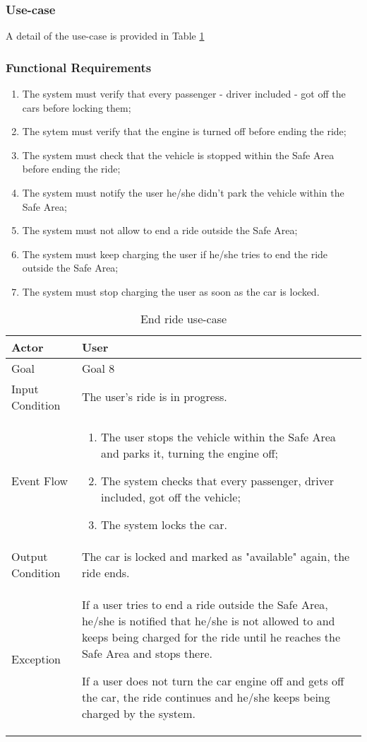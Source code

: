 \subsubsection{Use-case}
A detail of the use-case is provided in Table \ref{end_ride_uc}

\subsubsection{Functional Requirements}
\begin{enumerate}
\item The system must verify that every passenger - driver included - got off the cars before locking them;
\item The sytem must verify that the engine is turned off before ending the ride;
\item The system must check that the vehicle is stopped within the Safe Area before ending the ride;
\item The system must notify the user he/she didn't park the vehicle within the Safe Area;
\item The system must not allow to end a ride outside the Safe Area;
\item The system must keep charging the user if he/she tries to end the ride outside the Safe Area;
\item The system must stop charging the user as soon as the car is locked.
\end{enumerate}

\begin{table}[H]
\begin{center}
\begin{tabular}{p{} | p{}}
\hline
Actor & User\\
\hline
Goal & Goal 8\\
\hline
Input Condition & The user's ride is in progress.\\
\hline
Event Flow & 
\begin{enumerate}
\item The user stops the vehicle within the Safe Area and parks it, turning the engine off;
\item The system checks that every passenger, driver included, got off the vehicle;
\item The system locks the car.
\end{enumerate} \\
\hline
Output Condition & The car is locked and marked as "available" again, the ride ends.\\
\hline
Exception & If a user tries to end a ride outside the Safe Area, he/she is notified that he/she is not allowed to and keeps being charged for the ride until he reaches the Safe Area and stops there.

If a user does not turn the car engine off and gets off the car, the ride continues and he/she keeps being charged by the system.\\
\hline
\end{tabular}
\end{center}
\caption{End ride use-case}
\label{end_ride_uc}
\end{table}
